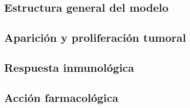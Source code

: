 \subsection{Estructura general del modelo}

\subsection{Aparición y proliferación tumoral}

\subsection{Respuesta inmunológica}


\subsection{Acción farmacológica}